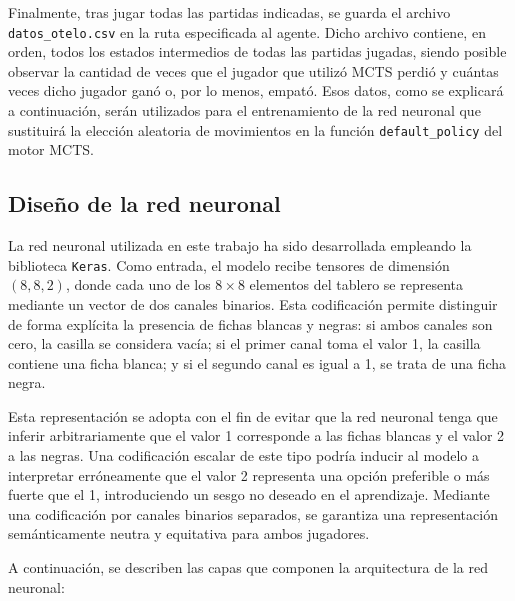 \documentclass[conference]{IEEEtran}
\begin{document}
Finalmente, tras jugar todas las partidas indicadas, se guarda el archivo \texttt{datos\_otelo.csv} en la ruta especificada al agente. Dicho archivo contiene, en orden, todos los estados intermedios de todas las partidas jugadas, siendo posible observar la cantidad de veces que el jugador que utilizó MCTS perdió y cuántas veces dicho jugador ganó o, por lo menos, empató. Esos datos, como se explicará a continuación, serán utilizados para el entrenamiento de la red neuronal que sustituirá la elección aleatoria de movimientos en la función \texttt{default\_policy} del motor MCTS.

\subsection{Diseño de la red neuronal}
La red neuronal utilizada en este trabajo ha sido desarrollada empleando la biblioteca \texttt{Keras}. Como entrada, el modelo recibe tensores de dimensión $(8, 8, 2)$, donde cada uno de los $8 \times 8$ elementos del tablero se representa mediante un vector de dos canales binarios. Esta codificación permite distinguir de forma explícita la presencia de fichas blancas y negras: si ambos canales son cero, la casilla se considera vacía; si el primer canal toma el valor 1, la casilla contiene una ficha blanca; y si el segundo canal es igual a 1, se trata de una ficha negra.



Esta representación se adopta con el fin de evitar que la red neuronal tenga que inferir arbitrariamente que el valor 1 corresponde a las fichas blancas y el valor 2 a las negras. Una codificación escalar de este tipo podría inducir al modelo a interpretar erróneamente que el valor 2 representa una opción preferible o más fuerte que el 1, introduciendo un sesgo no deseado en el aprendizaje. Mediante una codificación por canales binarios separados, se garantiza una representación semánticamente neutra y equitativa para ambos jugadores.

A continuación, se describen las capas que componen la arquitectura de la red neuronal:
\end{document}
